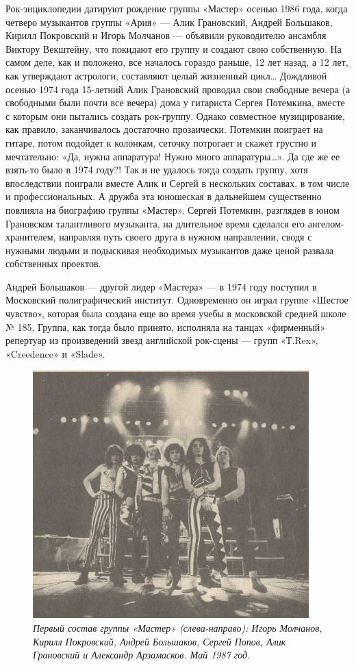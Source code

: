 \documentclass[16pt,a5paper,oneside]{book}
\begin{document}
Рок-энциклопедии датируют рождение группы «Мастер» осенью 1986 года, когда четверо музыкантов группы «Ария» — Алик
Грановский, Андрей Большаков, Кирилл Покровский и Игорь Молчанов — объявили руководителю ансамбля Виктору Векштейну,
что покидают его группу и создают свою собственную. На самом деле, как и положено, все началось гораздо раньше, 12 лет
назад, а 12 лет, как утверждают астрологи, составляют целый жизненный цикл\ldots
\newline
\newline
Дождливой осенью 1974 года 15-летний Алик Грановский проводил свои свободные вечера (а свободными были почти все вечера)
дома у гитариста Сергея Потемкина, вместе с которым они пытались создать рок-группу. Однако совместное музицирование,
как правило, заканчивалось достаточно прозаически. Потемкин поиграет на гитаре, потом подойдет к колонкам, сеточку
потрогает и скажет грустно и мечтательно: «Да, нужна аппаратура! Нужно много аппаратуры\ldots». Да где же ее взять-то
было в 1974 году?! Так и не удалось тогда создать группу, хотя впоследствии поиграли вместе Алик и Сергей в нескольких
составах, в том числе и профессиональных. А дружба эта юношеская в дальнейшем существенно повлияла на биографию группы
«Мастер». Сергей Потемкин, разглядев в юном Грановском талантливого музыканта, на длительное время сделался его
ангелом-хранителем, направляя путь своего друга в нужном направлении, сводя с нужными людьми и подыскивая необходимых
музыкантов даже ценой развала собственных проектов.

Андрей Большаков — другой лидер «Мастера» — в 1974 году поступил в Московский полиграфический институт. Одновременно он
играл группе «Шестое чувство», которая была создана еще во время учебы в московской средней школе № 185. Группа, как
тогда было принято, исполняла на танцах «фирменный» репертуар из произведений звезд английской рок-сцены — групп
«Т.Rex», «Creedence» и «Slade».

\begin{figure}
    \centering
    \includegraphics[scale=0.9]{Image01}
    \caption{\textit{
        Первый состав группы «Мастер» (слева-направо): Игорь Молчанов, Кирилл Покровский, Андрей Большаков, Сергей
        Попов, Алик Грановский и Александр Арзамасков. Май 1987 год.
    }}
\end{figure}
\end{document}
